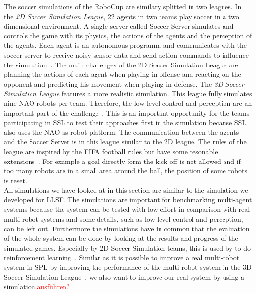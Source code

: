 The soccer simulations of the RoboCup are similary splitted in two leagues. In the \textit{2D Soccer Simulation League}, 22 agents in two teams play soccer in a two dimensional environment. A single server called Soccer Server simulates and controls the game with its physics, the actions of the agents and the perception of the agents. Each agent is an autonomous programm and communicates with the soccer server to receive noisy sensor data and send action-commands to influence the simulation~\cite{soccer_simulation}. The main challenges of the 2D Soccer Simulation League are planning the actions of each agent when playing in offense and reacting on the opponent and predicting his movement when playing in defense. The \textit{3D Soccer Simulation League} features a more realistic simulation. This league fully simulates nine NAO robots per team. Therefore, the low level control and perception are an important part of the challenge~\cite{soccer_simulation_low_level}. This is an important opportunity for the teams participating in SSL to test their approaches first in the simulation because SSL also uses the NAO as robot platform. The communication between the agents and the Soccer Server is in this league similar to the 2D league. The rules of the league are inspired by the FIFA football rules but have some resonable extensions~\cite{soccer_rules_3d}. For example a goal directly form the kick off is not allowed and if too many robots are in a small area around the ball, the position of some robots is reset.\\
All simulations we have looked at in this section are similar to the simulation we developed for LLSF. The simulations are important for benchmarking multi-agent systems because the system can be tested with low effort in comparison with real multi-robot systems and some details, such as low level control and perception, can be left out.  Furthermore the simulations have in common that the evaluation of the whole system can be done by looking at the results and progress of the simulated games. Especially by 2D Soccer Simulation teams, this is used by to do reinforcement learning~\cite{simsoccer_reinforcement_1,simsoccer_reinforcement_2}. Similar as it is possible to improve a real multi-robot system in SPL by improving the performance of the multi-robot system in the 3D Soccer Simulation League~\cite{from_sim_to_real}, we also want to improve our real system by using a simulation.\textcolor{red}{ausführen?}


